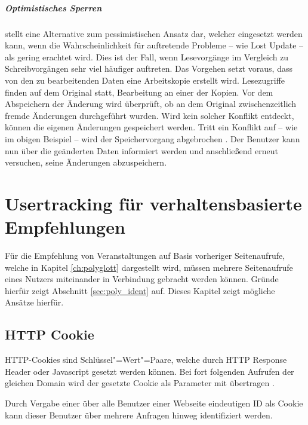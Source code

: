 \begin{appendices}
\paragraph{Optimistisches Sperren} stellt eine Alternative zum pessimistischen Ansatz dar, welcher eingesetzt werden kann, wenn die Wahrscheinlichkeit für auftretende Probleme -- wie Lost Update -- als gering erachtet wird. Dies ist der Fall, wenn Lesevorgänge im Vergleich zu Schreibvorgängen sehr viel häufiger auftreten. Das Vorgehen setzt voraus, dass von den zu bearbeitenden Daten eine Arbeitskopie erstellt wird. Lesezugriffe finden auf dem Original statt, Bearbeitung an einer der Kopien. Vor dem Abspeichern der Änderung wird überprüft, ob an dem Original zwischenzeitlich fremde Änderungen durchgeführt wurden. Wird kein solcher Konflikt entdeckt, können die eigenen Änderungen gespeichert werden. Tritt ein Konflikt auf -- wie im obigen Beispiel -- wird der Speichervorgang abgebrochen \cite[S. 318]{Harrington.2009}. Der Benutzer kann nun über die geänderten Daten informiert werden und anschließend erneut versuchen, seine Änderungen abzuspeichern.

\chapter{Usertracking für verhaltensbasierte Empfehlungen}
\label{ch:tracking}

\vspace{2\baselineskip}
Für die Empfehlung von Veranstaltungen auf Basis vorheriger Seitenaufrufe, welche in Kapitel \ref{ch:polyglott} dargestellt wird, müssen mehrere Seitenaufrufe eines Nutzers miteinander in Verbindung gebracht werden können. Gründe hierfür zeigt Abschnitt \ref{sec:poly_ident} auf. Dieses Kapitel zeigt mögliche Ansätze hierfür.

\section{HTTP Cookie}
\label{sec:ident_cookie}

HTTP-Cookies sind Schlüssel"=Wert"=Paare, welche durch HTTP Response Header oder Javascript gesetzt werden können. Bei fort folgenden Aufrufen der gleichen Domain wird der gesetzte Cookie als Parameter mit übertragen \cite[S. 7, 25]{InternetEngineeringTaskForce.April2011}.

Durch Vergabe einer über alle Benutzer einer Webseite eindeutigen ID als Cookie kann dieser Benutzer über mehrere Anfragen hinweg identifiziert werden.


\end{appendices}
